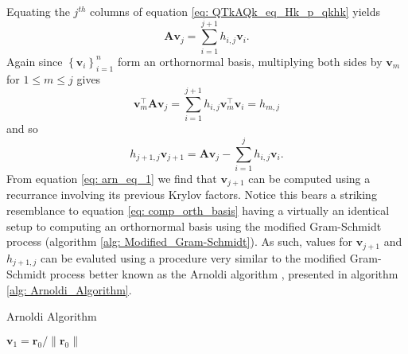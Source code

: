 Equating the $j^{th}$ columns of equation \ref{eq: QTkAQk_eq_Hk_p_qkhk} yields
\[
    \bm{A} \bm{v}_j = \sum_{i=1}^{j+1} h_{i,j} \bm{v}_{i}.
\]
Again since $\left\{ \bm{v}_i \right\}_{i=1}^{n}$ form an orthornormal basis, multiplying both sides by $\bm{v}_m$ for $1 \leq m \leq j$ gives
\[
    \bm{v}_m^{\intercal} \bm{A} \bm{v}_j = \sum_{i=1}^{j+1} h_{i,j} \bm{v}_m^{\intercal} \bm{v}_{i} = h_{m,j}
\]
and so
\begin{equation}\label{eq: arn_eq_1}
    h_{j+1,j} \bm{v}_{j+1} = \bm{A} \bm{v}_j - \sum_{i=1}^{j} h_{i,j} \bm{v}_{i}.
\end{equation}
From equation \ref{eq: arn_eq_1} we find that $\bm{v}_{j+1}$ can be computed using a recurrance involving its previous Krylov factors. Notice this bears a striking resemblance to equation \ref{eq: comp_orth_basis} having a virtually an identical setup to computing an orthornormal basis using the modified Gram-Schmidt process (algorithm \ref{alg: Modified_Gram-Schmidt}). As such, values for $\bm{v}_{j+1}$ and $h_{j+1,j}$ can be evaluted using a procedure very similar to the modified Gram-Schmidt process better known as the Arnoldi algorithm \cite{TrefethenLloydN.LloydNicholas1997Nla/,DemmelJamesW1997Anla}, presented in algorithm \ref{alg: Arnoldi_Algorithm}.

{\centering
\begin{minipage}{.85\linewidth}
    \begin{algorithm}[H]
        \caption{Arnoldi Algorithm}
        \label{alg: Arnoldi_Algorithm}
        \SetAlgoLined
        \DontPrintSemicolon

        \BlankLine
        $\bm{v}_1 = \bm{r}_0 / \| \bm{r}_0 \|$\;
        \BlankLine
    \end{algorithm}
\end{minipage}
\par
}

